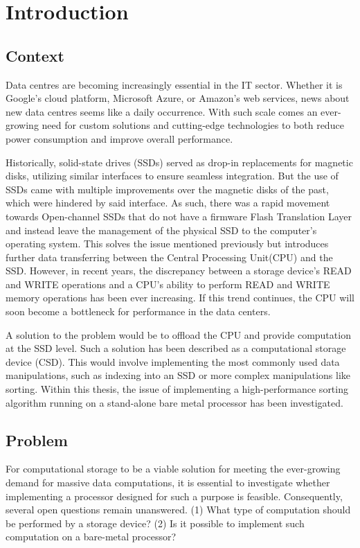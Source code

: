 \section{Introduction}
\subsection{Context}\label{sec:context}
Data centres are becoming increasingly essential in the IT sector. Whether it is
Google's cloud platform, Microsoft Azure, or Amazon's web services, news about
new data centres seems like a daily occurrence. With such scale comes an
ever-growing need for custom solutions and cutting-edge technologies to both
reduce power consumption and improve overall performance.

Historically, solid-state drives (SSDs) served as drop-in replacements for
magnetic disks, utilizing similar interfaces to ensure seamless integration. But
the use of SSDs came with multiple improvements over the magnetic disks of the
past, which were hindered by said interface. As such, there was a rapid movement
towards Open-channel SSDs that do not have a firmware Flash Translation Layer
and instead leave the management of the physical SSD to the computer's operating
system. This solves the issue mentioned previously but introduces further data
transferring between the Central Processing Unit(CPU) and the SSD. However, in
recent years, the discrepancy between a storage device's READ and WRITE
operations and a CPU's ability to perform READ and WRITE memory operations has
been ever increasing. If this trend continues, the CPU will soon become a
bottleneck for performance in the data centers.

A solution to the problem would be to offload the CPU and provide computation at
the SSD level. Such a solution has been described as a computational storage
device (CSD). This would involve implementing the most commonly used data
manipulations, such as indexing into an SSD or more complex manipulations like
sorting. Within this thesis, the issue of implementing a high-performance
sorting algorithm running on a stand-alone bare metal processor has been
investigated.


\subsection{Problem}\label{sec:problem}
For computational storage to be a viable solution for meeting the ever-growing
demand for massive data computations, it is essential to investigate whether
implementing a processor designed for such a purpose is feasible. Consequently,
several open questions remain unanswered. (1) What type of computation should be
performed by a storage device? (2) Is it possible to implement such computation
on a bare-metal processor?

